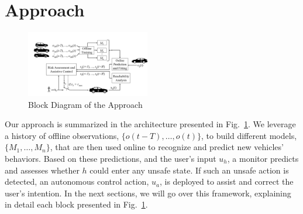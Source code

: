 \documentclass[letterpaper, 10 pt, conference]{ieeeconf}  %
\newcommand\NB[1]{$\spadesuit$\footnote{NB: #1}}
\begin{document}
\section{Approach} \label{sec:approach}%
\begin{figure}[h]
    \includegraphics[width=0.48\textwidth]{fig/approach.png}
    \caption{Block Diagram of the Approach}
    \label{fig:app}
\end{figure}

Our approach is summarized in the architecture presented in Fig.~\ref{fig:app}. We leverage a history of offline observations, $\{o(t-T),\ldots,o(t)\}$, to build different models, $\{M_1,\ldots,M_n\}$, that are then used online to recognize and predict new vehicles' behaviors. Based on these predictions, and the user's input $u_h$, a monitor predicts and assesses whether $h$ could enter any unsafe state. If such an unsafe action is detected, an autonomous control action, $u_a$, is deployed to assist and correct the user's intention. In the next sections, we will go over this framework, explaining in detail each block presented in Fig.~\ref{fig:app}.


 
\end{document}

